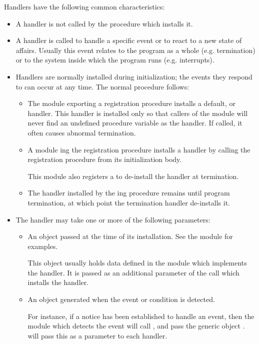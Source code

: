 Handlers have the following common characteristics:
\begin{itemize}
\item
   A handler is not called by the procedure which installs it.
\item
   A handler is called to handle a specific event or to react to a new
    state of affairs.  Usually this event relates to the program as a
    whole (e.g. termination) or to the system inside which the
    program runs (e.g. interrupts).
\item
   Handlers are normally installed during initialization; the events
    they respond to can occur at any time.  The normal procedure 
    follows:
   \begin{itemize}
   \item
    The module exporting a registration procedure installs a default, or
     handler.  This handler is installed only so that
    callers of the module will never find an undefined procedure variable
    as the handler.  If called, it often causes abnormal termination.
   \item
    A module ing the registration procedure installs a handler
    by calling the registration procedure from its initialization body.

    This module also registers a  to de-install
    the handler at termination.
   \item
    The handler installed by the ing procedure remains until
    program termination, at which point the termination handler de-installs
    it.
   \end{itemize}
\item
   The handler may take one or more of the following parameters:
   \begin{itemize}
   \item
         An object passed at the time of its installation.  See the module
          for examples.

         This object usually holds data defined in the module which implements
         the handler.  It is passed as an additional parameter of the call
         which installs the handler.
   \item
         An object generated when the event or condition is detected.
         
         For instance, if a notice has been established to handle an event,
         then the module which detects the event will call ,
         and pass the generic object . 
         will pass this as a parameter to each handler.
   \end{itemize}
\end{itemize}

